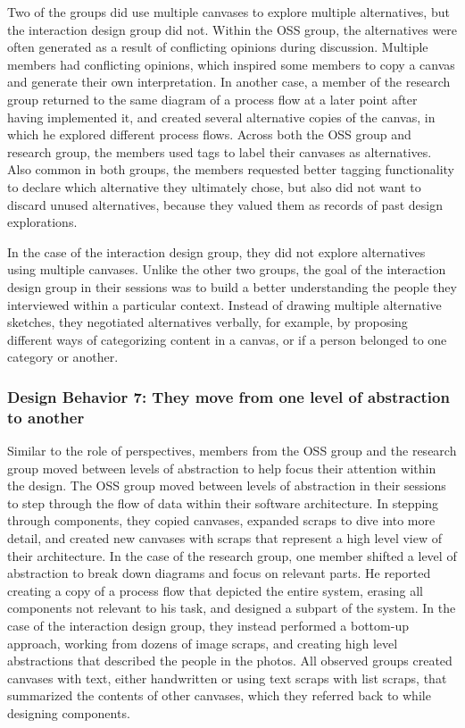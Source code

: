 Two of the groups did use multiple canvases to explore multiple alternatives, but the interaction design group did not. Within the OSS group, the alternatives were often generated as a result of conflicting opinions during discussion. Multiple members had conflicting opinions, which inspired some members to copy a canvas and generate their own interpretation. In another case, a member of the research group returned to the same diagram of a process flow at a later point after having implemented it, and created several alternative copies of the canvas, in which he explored different process flows. Across both the OSS group and research group, the members used tags to label their canvases as alternatives. Also common in both groups, the members requested better tagging functionality to declare which alternative they ultimately chose, but also did not want to discard unused alternatives, because they valued them as records of past design explorations.

In the case of the interaction design group, they did not explore alternatives using multiple canvases. Unlike the other two groups, the goal of the interaction design group in their sessions was to build a better understanding the people they interviewed within a particular context. Instead of drawing multiple alternative sketches, they negotiated alternatives verbally, for example, by proposing different ways of categorizing content in a canvas, or if a person belonged to one category or another.

\subsubsection{Design Behavior 7: They move from one level of abstraction to another}

Similar to the role of perspectives, members from the OSS group and the research group moved between levels of abstraction to help focus their attention within the design. The OSS group moved between levels of abstraction in their sessions to step through the flow of data within their software architecture. In stepping through components, they copied canvases, expanded scraps to dive into more detail, and created new canvases with scraps that represent a high level view of their architecture. In the case of the research group, one member shifted a level of abstraction to break down diagrams and focus on relevant parts. He reported creating a copy of a process flow that depicted the entire system, erasing all components not relevant to his task, and designed a subpart of the system. In the case of the interaction design group, they instead performed a bottom-up approach, working from dozens of image scraps, and creating high level abstractions that described the people in the photos. All observed groups created canvases with text, either handwritten or using text scraps with list scraps, that summarized the contents of other canvases, which they referred back to while designing components. 


